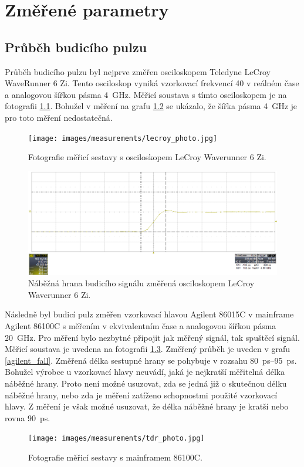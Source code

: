 \chapter{Změřené parametry}

\section{Průběh budicího pulzu}
Průběh budicího pulzu byl nejprve změřen osciloskopem Teledyne LeCroy WaveRunner 6 Zi. Tento osciloskop vyniká vzorkovací frekvencí \SI{40}{\gigasample} v reálném čase a analogovou šířkou pásma \SI{4}{\giga\hertz}. Měřicí soustava s tímto osciloskopem je na fotografii \ref{lecroy_photo}. Bohužel v měření na grafu \ref{lecroy} se ukázalo, že šířka pásma \SI{4}{\giga\hertz} je pro toto měření nedostatečná.

\begin{figure}[htbp]
\texttt{[image: images/measurements/lecroy\_photo.jpg]}\caption{Fotografie měřicí sestavy s osciloskopem LeCroy Waverunner 6 Zi.}\label{lecroy_photo}
\end{figure}

\begin{figure}[htbp]
\includegraphics[width=\textwidth,keepaspectratio]{images/measurements/lecroy.png}\caption{Náběžná hrana budicího signálu změřená osciloskopem LeCroy Waverunner 6 Zi.}\label{lecroy}
\end{figure}

Následně byl budicí pulz změřen vzorkovací hlavou Agilent 86015C v mainframe Agilent 86100C s měřením v ekvivalentním čase a analogovou šířkou pásma \SI{20}{\giga\hertz}. Pro měření bylo nezbytné připojit jak měřený signál, tak spuštěcí signál. Měřicí soustava je uvedena na fotografii \ref{agilent_photo}. Změřený průběh je uveden v grafu \ref{agilent_fall}. Změřená délka sestupné hrany se pohybuje v rozsahu \SIrange{80}{95}{\pico\second}. Bohužel výrobce u vzorkovací hlavy neuvádí, jaká je nejkratší měřitelná délka náběžné hrany. Proto není možné usuzovat, zda se jedná již o skutečnou délku náběžné hrany, nebo zda je měření zatíženo schopnostmi použité vzorkovací hlavy. Z měření je však možné usuzovat, že délka náběžné hrany je kratší nebo rovna \SI{90}{\pico\second}.
\begin{figure}[htbp]
\texttt{[image: images/measurements/tdr\_photo.jpg]}\caption{Fotografie měřicí sestavy s mainframem 86100C.}\label{agilent_photo}
\end{figure}

